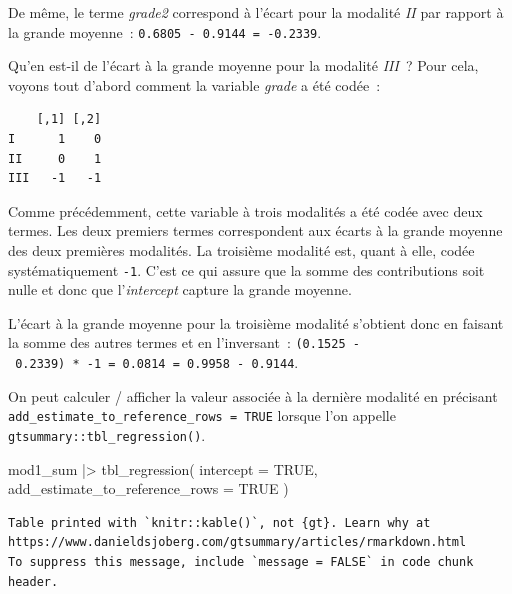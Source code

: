 \documentclass[
  letterpaper,
  DIV=11,
  numbers=noendperiod,
  oneside]{scrreprt}
\newenvironment{Shaded}{\begin{snugshade}}{\end{snugshade}}
\newcommand{\AttributeTok}[1]{\textcolor[rgb]{0.40,0.45,0.13}{#1}}
\newcommand{\ConstantTok}[1]{\textcolor[rgb]{0.56,0.35,0.01}{#1}}
\newcommand{\FunctionTok}[1]{\textcolor[rgb]{0.28,0.35,0.67}{#1}}
\newcommand{\NormalTok}[1]{\textcolor[rgb]{0.00,0.23,0.31}{#1}}
\newcommand{\SpecialCharTok}[1]{\textcolor[rgb]{0.37,0.37,0.37}{#1}}
\begin{document}
De même, le terme \emph{grade2} correspond à l'écart pour la modalité
\emph{II} par rapport à la grande moyenne~:
\texttt{0.6805\ -\ 0.9144\ =\ -0.2339}.

Qu'en est-il de l'écart à la grande moyenne pour la modalité
\emph{III}~? Pour cela, voyons tout d'abord comment la variable
\emph{grade} a été codée~:

\begin{Shaded}
\end{Shaded}

\begin{verbatim}
    [,1] [,2]
I      1    0
II     0    1
III   -1   -1
\end{verbatim}

Comme précédemment, cette variable à trois modalités a été codée avec
deux termes. Les deux premiers termes correspondent aux écarts à la
grande moyenne des deux premières modalités. La troisième modalité est,
quant à elle, codée systématiquement \texttt{-1}. C'est ce qui assure
que la somme des contributions soit nulle et donc que l'\emph{intercept}
capture la grande moyenne.

L'écart à la grande moyenne pour la troisième modalité s'obtient donc en
faisant la somme des autres termes et en l'inversant~:
\texttt{(0.1525\ -\ 0.2339)\ *\ -1\ =\ 0.0814\ =\ 0.9958\ -\ 0.9144}.

On peut calculer / afficher la valeur associée à la dernière modalité en
précisant \texttt{add\_estimate\_to\_reference\_rows\ =\ TRUE} lorsque
l'on appelle \texttt{gtsummary::tbl\_regression()}.

\begin{Shaded}
\begin{Highlighting}[]
\NormalTok{mod1\_sum }\SpecialCharTok{|\textgreater{}}
  \FunctionTok{tbl\_regression}\NormalTok{(}
    \AttributeTok{intercept =} \ConstantTok{TRUE}\NormalTok{, }
    \AttributeTok{add\_estimate\_to\_reference\_rows =} \ConstantTok{TRUE}
\NormalTok{  )}
\end{Highlighting}
\end{Shaded}

\begin{verbatim}
Table printed with `knitr::kable()`, not {gt}. Learn why at
https://www.danieldsjoberg.com/gtsummary/articles/rmarkdown.html
To suppress this message, include `message = FALSE` in code chunk header.
\end{verbatim}
\end{document}
